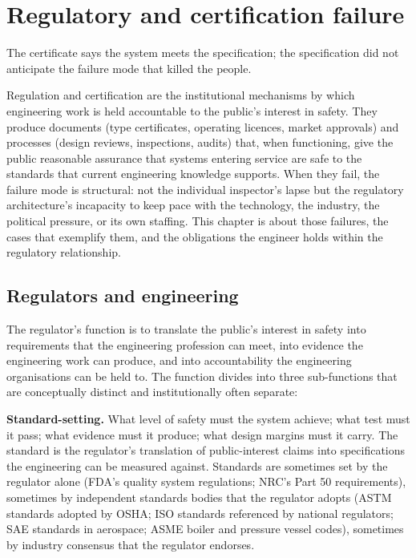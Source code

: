 \chapter{Regulatory and certification failure}
\label{vol10:ch11}

\epigraph{The certificate says the system meets the specification; the specification did not anticipate the failure mode that killed the people.}{}


\noindent
Regulation and certification are the institutional mechanisms by which engineering work is held accountable to the public's interest in safety. They produce documents (type certificates, operating licences, market approvals) and processes (design reviews, inspections, audits) that, when functioning, give the public reasonable assurance that systems entering service are safe to the standards that current engineering knowledge supports. When they fail, the failure mode is structural: not the individual inspector's lapse but the regulatory architecture's incapacity to keep pace with the technology, the industry, the political pressure, or its own staffing. This chapter is about those failures, the cases that exemplify them, and the obligations the engineer holds within the regulatory relationship.

\section{Regulators and engineering}

The regulator's function is to translate the public's interest in safety into requirements that the engineering profession can meet, into evidence the engineering work can produce, and into accountability the engineering organisations can be held to. The function divides into three sub-functions that are conceptually distinct and institutionally often separate:

\textbf{Standard-setting.} What level of safety must the system achieve; what test must it pass; what evidence must it produce; what design margins must it carry. The standard is the regulator's translation of public-interest claims into specifications the engineering can be measured against. Standards are sometimes set by the regulator alone (FDA's quality system regulations; NRC's Part 50 requirements), sometimes by independent standards bodies that the regulator adopts (ASTM standards adopted by OSHA; ISO standards referenced by national regulators; SAE standards in aerospace; ASME boiler and pressure vessel codes), sometimes by industry consensus that the regulator endorses.

